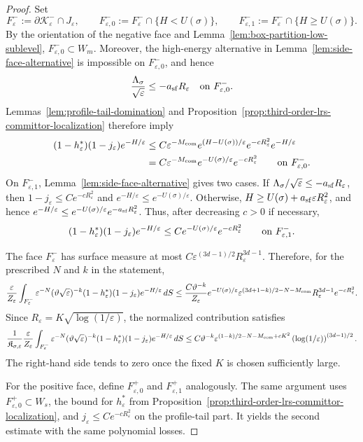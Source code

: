 \documentclass[11pt]{article}
\numberwithin{equation}{section}
\theoremstyle{plain}
\theoremstyle{definition}
\theoremstyle{remark}
\newcommand{\eps}{\varepsilon}
\begin{document}
\begin{proof}
Set
\[
F_\eps^-:=\partial\mathcal K_\eps^-\cap J_\eps,
\qquad
F_{\eps,0}^-:=F_\eps^-\cap\{H<U(\sigma)\},
\qquad
F_{\eps,1}^-:=F_\eps^-\cap\{H\ge U(\sigma)\}.
\]
By the orientation of the negative face and
Lemma~\ref{lem:box-partition-low-sublevel}, $F_{\eps,0}^-\subset W_m$.
Moreover, the high-energy alternative in
Lemma~\ref{lem:side-face-alternative} is impossible on $F_{\eps,0}^-$, and
hence
\[
\frac{\Lambda_\sigma}{\sqrt\eps}\le-a_{\rm sf}R_\eps
\quad\hbox{on }F_{\eps,0}^-.
\]
Lemmas~\ref{lem:profile-tail-domination} and
Proposition~\ref{prop:third-order-lrs-committor-localization} therefore imply
\begin{equation}
\label{eq:m-side-low-mismatch-bound}
\begin{aligned}
(1-h_\eps^*)(1-j_\eps)e^{-H/\eps}
&\le
C\eps^{-M_{\rm com}}e^{(H-U(\sigma))/\eps}
e^{-cR_\eps^2}e^{-H/\eps} \\
&=C\eps^{-M_{\rm com}}e^{-U(\sigma)/\eps}e^{-cR_\eps^2}
\qquad\hbox{on }F_{\eps,0}^-.
\end{aligned}
\end{equation}
On $F_{\eps,1}^-$, Lemma~\ref{lem:side-face-alternative} gives two cases.  If
$\Lambda_\sigma/\sqrt\eps\le-a_{\rm sf}R_\eps$, then
$1-j_\eps\le Ce^{-cR_\eps^2}$ and $e^{-H/\eps}\le e^{-U(\sigma)/\eps}$.
Otherwise,
$H\ge U(\sigma)+a_{\rm sf}\eps R_\eps^2$, and hence
$e^{-H/\eps}\le e^{-U(\sigma)/\eps}e^{-a_{\rm sf}R_\eps^2}$.  Thus, after
decreasing $c>0$ if necessary,
\begin{equation}
\label{eq:m-side-high-mismatch-bound}
(1-h_\eps^*)(1-j_\eps)e^{-H/\eps}
\le Ce^{-U(\sigma)/\eps}e^{-cR_\eps^2}
\qquad\hbox{on }F_{\eps,1}^-.
\end{equation}

The face $F_\eps^-$ has surface measure at most
$C\eps^{(3d-1)/2}R_\eps^{3d-1}$.  Therefore, for the prescribed $N$ and $k$
in the statement,
\begin{align*}
\frac{\eps}{Z_\eps}
\int_{F_\eps^-}\eps^{-N}(\vartheta\sqrt\eps)^{-k}
(1-h_\eps^*)(1-j_\eps)e^{-H/\eps}\,dS
\le
\frac{C\vartheta^{-k}}{Z_\eps}e^{-U(\sigma)/\eps}
\eps^{(3d+1-k)/2-N-M_{\rm com}}R_\eps^{3d-1}e^{-cR_\eps^2}.
\end{align*}
Since $R_\eps=K\sqrt{\log(1/\eps)}$, the normalized contribution satisfies
\[
\frac{1}{\mathfrak K_{\sigma,\eps}}
\frac{\eps}{Z_\eps}
\int_{F_\eps^-}\eps^{-N}(\vartheta\sqrt\eps)^{-k}
(1-h_\eps^*)(1-j_\eps)e^{-H/\eps}\,dS
\le
C\vartheta^{-k}\eps^{(1-k)/2-N-M_{\rm com}+cK^2}
\left(\log(1/\eps)\right)^{(3d-1)/2}.
\]
The right-hand side tends to zero once the fixed $K$ is chosen sufficiently
large.

For the positive face, define $F_{\eps,0}^+$ and $F_{\eps,1}^+$ analogously.
The same argument uses $F_{\eps,0}^+\subset W_s$, the bound for $h_\eps^*$
from Proposition~\ref{prop:third-order-lrs-committor-localization}, and
$j_\eps\le Ce^{-cR_\eps^2}$ on the profile-tail part.  It yields the second
estimate with the same polynomial losses.
\end{proof}
\end{document}
